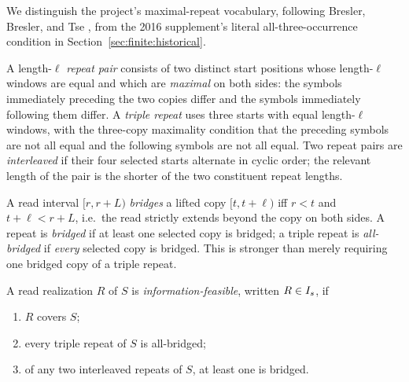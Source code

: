 We distinguish the project's maximal-repeat vocabulary, following
Bresler, Bresler, and Tse \parencite{bresler2013}, from the 2016 supplement's
literal all-three-occurrence condition in Section~\ref{sec:finite:historical}.

\begin{definition}
\label{def:repeats}
A length-$\ell$ \emph{repeat pair} consists of two distinct start positions whose
length-$\ell$ windows are equal and which are \emph{maximal} on both sides: the
symbols immediately preceding the two copies differ and the symbols immediately
following them differ. A \emph{triple repeat} uses three starts with equal
length-$\ell$ windows, with the three-copy maximality condition that the
preceding symbols are not all equal and the following symbols are not all equal.
Two repeat pairs are \emph{interleaved} if their four selected starts
alternate in cyclic order; the relevant length of the pair is the
shorter of the two constituent repeat lengths.
\end{definition}

A read interval $[r,r+L)$ \emph{bridges} a lifted copy $[t,t+\ell)$ iff
$r<t$ and $t+\ell<r+L$, i.e.\ the read strictly extends beyond the copy on both
sides. A repeat is \emph{bridged} if at least one selected copy is bridged; a
triple repeat is \emph{all-bridged} if \emph{every} selected copy is bridged.
This is stronger than merely requiring one bridged copy of a triple repeat.

\begin{definition}
\label{def:Is}
A read realization $R$ of $S$ is \emph{information-feasible}, written $R \in
I_s$, if
\begin{enumerate}[label=(C\arabic*),leftmargin=*]
  \item $R$ covers $S$;
  \item every triple repeat of $S$ is all-bridged;
  \item of any two interleaved repeats of $S$, at least one is bridged.
\end{enumerate}
\end{definition}

